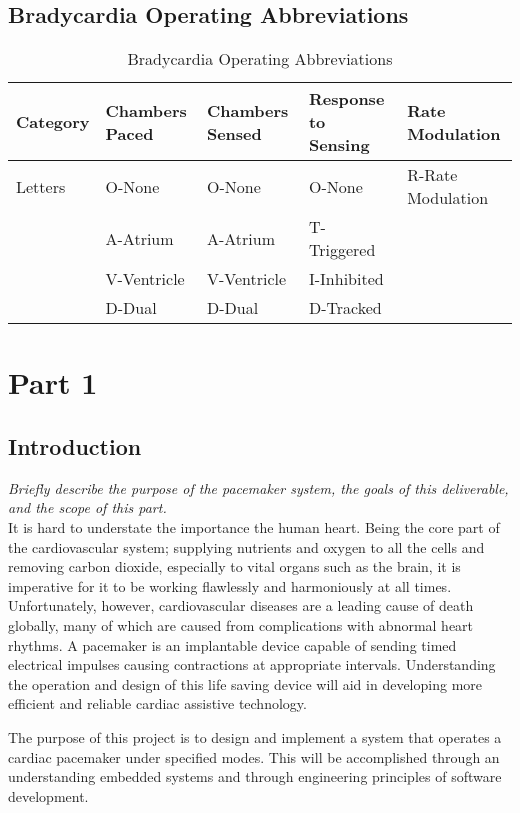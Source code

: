 \documentclass{article}
\begin{document}
\subsection{Bradycardia Operating Abbreviations}
\begin{table}[H]
    \begin{tabular}{|m{2cm}|m{2cm}|m{2cm}|m{2cm}|m{3cm}|}
        \hline
        \textbf{Category} & \textbf{Chambers Paced} & \textbf{Chambers Sensed} & \textbf{Response to Sensing} & \textbf{Rate Modulation} \\
        \hline 
        Letters     & O-None & O-None & O-None & R-Rate Modulation\\
                    & A-Atrium & A-Atrium & T-Triggered & \\
                    & V-Ventricle & V-Ventricle & I-Inhibited & \\
                    & D-Dual & D-Dual & D-Tracked & \\
        \hline
    \end{tabular}
    \caption{Bradycardia Operating Abbreviations}
\end{table}
\newpage
\section{Part 1}

\subsection{Introduction}
\textit{Briefly describe the purpose of the pacemaker system, the goals of this deliverable, and the scope of this part.}
\vspace{0.5cm}\\
It is hard to understate the importance the human heart. Being the core part of the cardiovascular system; supplying nutrients and oxygen to all the cells
and removing carbon dioxide, especially to vital organs such as the brain, it is imperative for it to be working flawlessly and harmoniously at all times.
Unfortunately, however, cardiovascular diseases are a leading cause of death globally, many of which are caused from complications with 
abnormal heart rhythms. A pacemaker is an implantable device capable of sending timed electrical impulses causing contractions at 
appropriate intervals. Understanding the operation and design of this life saving device will aid in developing 
more efficient and reliable cardiac assistive technology. 

The purpose of this project is to design and implement a system that operates a cardiac pacemaker 
under specified modes. This will be accomplished through an understanding embedded systems and through engineering 
principles of software development. 
\end{document}

